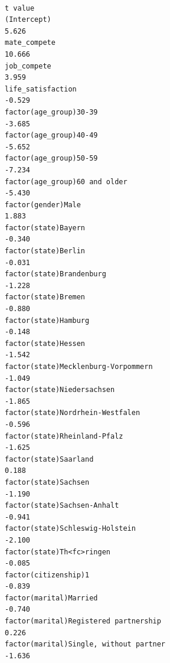 \documentclass[
]{article}
\begin{document}
\begin{table}
\begin{minipage}[t]{\linewidth}
{\begin{verbatim}
                                                                                  t value
(Intercept)                                                                         5.626
mate_compete                                                                       10.666
job_compete                                                                         3.959
life_satisfaction                                                                  -0.529
factor(age_group)30-39                                                             -3.685
factor(age_group)40-49                                                             -5.652
factor(age_group)50-59                                                             -7.234
factor(age_group)60 and older                                                      -5.430
factor(gender)Male                                                                  1.883
factor(state)Bayern                                                                -0.340
factor(state)Berlin                                                                -0.031
factor(state)Brandenburg                                                           -1.228
factor(state)Bremen                                                                -0.880
factor(state)Hamburg                                                               -0.148
factor(state)Hessen                                                                -1.542
factor(state)Mecklenburg-Vorpommern                                                -1.049
factor(state)Niedersachsen                                                         -1.865
factor(state)Nordrhein-Westfalen                                                   -0.596
factor(state)Rheinland-Pfalz                                                       -1.625
factor(state)Saarland                                                               0.188
factor(state)Sachsen                                                               -1.190
factor(state)Sachsen-Anhalt                                                        -0.941
factor(state)Schleswig-Holstein                                                    -2.100
factor(state)Th<fc>ringen                                                          -0.085
factor(citizenship)1                                                               -0.839
factor(marital)Married                                                             -0.740
factor(marital)Registered partnership                                               0.226
factor(marital)Single, without partner                                             -1.636

\end{verbatim}}
\end{minipage}
\end{table}
\end{document}
